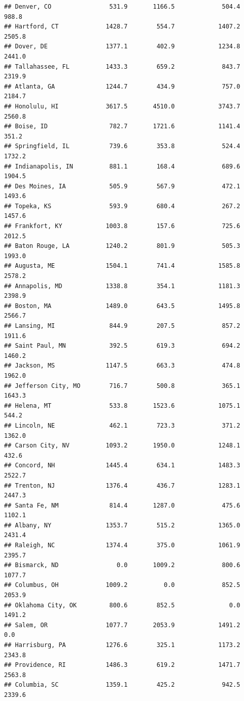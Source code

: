 \documentclass[
]{article}
\begin{document}
\begin{verbatim}
## Denver, CO                531.9       1166.5             504.4     988.8
## Hartford, CT             1428.7        554.7            1407.2    2505.8
## Dover, DE                1377.1        402.9            1234.8    2441.0
## Tallahassee, FL          1433.3        659.2             843.7    2319.9
## Atlanta, GA              1244.7        434.9             757.0    2184.7
## Honolulu, HI             3617.5       4510.0            3743.7    2560.8
## Boise, ID                 782.7       1721.6            1141.4     351.2
## Springfield, IL           739.6        353.8             524.4    1732.2
## Indianapolis, IN          881.1        168.4             689.6    1904.5
## Des Moines, IA            505.9        567.9             472.1    1493.6
## Topeka, KS                593.9        680.4             267.2    1457.6
## Frankfort, KY            1003.8        157.6             725.6    2012.5
## Baton Rouge, LA          1240.2        801.9             505.3    1993.0
## Augusta, ME              1504.1        741.4            1585.8    2578.2
## Annapolis, MD            1338.8        354.1            1181.3    2398.9
## Boston, MA               1489.0        643.5            1495.8    2566.7
## Lansing, MI               844.9        207.5             857.2    1911.6
## Saint Paul, MN            392.5        619.3             694.2    1460.2
## Jackson, MS              1147.5        663.3             474.8    1962.0
## Jefferson City, MO        716.7        500.8             365.1    1643.3
## Helena, MT                533.8       1523.6            1075.1     544.2
## Lincoln, NE               462.1        723.3             371.2    1362.0
## Carson City, NV          1093.2       1950.0            1248.1     432.6
## Concord, NH              1445.4        634.1            1483.3    2522.7
## Trenton, NJ              1376.4        436.7            1283.1    2447.3
## Santa Fe, NM              814.4       1287.0             475.6    1102.1
## Albany, NY               1353.7        515.2            1365.0    2431.4
## Raleigh, NC              1374.4        375.0            1061.9    2395.7
## Bismarck, ND                0.0       1009.2             800.6    1077.7
## Columbus, OH             1009.2          0.0             852.5    2053.9
## Oklahoma City, OK         800.6        852.5               0.0    1491.2
## Salem, OR                1077.7       2053.9            1491.2       0.0
## Harrisburg, PA           1276.6        325.1            1173.2    2343.8
## Providence, RI           1486.3        619.2            1471.7    2563.8
## Columbia, SC             1359.1        425.2             942.5    2339.6

\end{verbatim}
\end{document}
